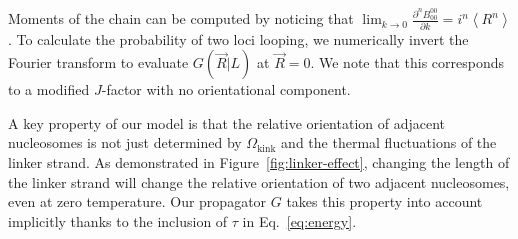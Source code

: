 \documentclass[%
 reprint,
superscriptaddress,
showpacs,preprintnumbers,
 amsmath,amssymb,
 aps,
 prl,
]{revtex4-1}
\newcommand{\greens}[2][\Omega_0; L]{G(#2|#1)}
\begin{document}
Moments of the chain can be computed by noticing that
    $\lim_{k\to0} \frac{\partial^n B_{00}^{00}}{\partial k} = i^n \left\langle
    R^n\right\rangle$.
To calculate the probability of two loci looping, we numerically invert
    the Fourier transform to evaluate $\greens[L]{\vec{R}}$ at $\vec{R} = 0$.
We note that this corresponds to a modified $J$-factor with no orientational
    component.

A key property of our model is that the relative orientation of adjacent
    nucleosomes is not just determined by $\Omega_\text{kink}$ and the thermal
    fluctuations of the linker strand.
As demonstrated in Figure~\ref{fig:linker-effect}, changing the length of the
    linker strand will change the relative orientation of two adjacent
    nucleosomes, even at zero temperature.
Our propagator $G$ takes this property into account implicitly thanks to the
    inclusion of $\tau$ in Eq.~\ref{eq:energy}.
\end{document}
